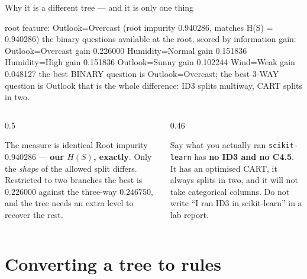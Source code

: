 \documentclass[aspectratio=169]{beamer}
\begin{document}
\begin{frame}[fragile,shrink=8]{Why it is a different tree --- and it is only one thing}
\begin{outblk}
root feature: Outlook=Overcast   (root impurity 0.940286, matches H(S) = 0.940286)
the binary questions available at the root, scored by information gain:
   Outlook=Overcast       gain 0.226000
   Humidity=Normal        gain 0.151836
   Humidity=High          gain 0.151836
   Outlook=Sunny          gain 0.102244
   Wind=Weak              gain 0.048127
the best BINARY question is Outlook=Overcast; the best 3-WAY question is Outlook
that is the whole difference: ID3 splits multiway, CART splits in two.
\end{outblk}
\begin{columns}[T]
  \begin{column}{0.5\textwidth}
    \begin{exampleblock}{The measure is identical}
      \small Root impurity $0.940286$ --- \textbf{our $H(S)$, exactly}. Only
      the \emph{shape} of the allowed split differs. Restricted to two
      branches the best is $0.226000$ against the three-way $0.246750$, and
      the tree needs an extra level to recover the rest.
    \end{exampleblock}
  \end{column}
  \begin{column}{0.46\textwidth}
    \begin{alertblock}{Say what you actually ran}
      \small \texttt{scikit-learn} has \textbf{no ID3 and no C4.5}. It has an
      optimised CART, it always splits in two, and it will not take
      categorical columns. Do not write ``I ran ID3 in scikit-learn'' in a
      lab report.
    \end{alertblock}
  \end{column}
\end{columns}
\end{frame}

\section[Rules]{Converting a tree to rules}
\label{sec:rules}
\end{document}

